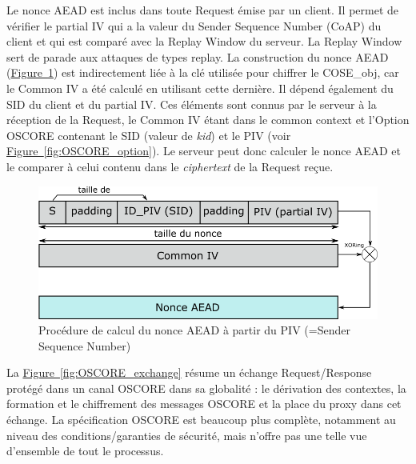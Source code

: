 \documentclass[]{report}
\newcommand{\wordlink}[2]{\hyperref[#2]{#1~\ref{#2}}}
\begin{document}
Le nonce AEAD est inclus dans toute Request émise par un client. Il permet de vérifier le partial IV qui a la valeur du Sender Sequence Number (CoAP) du client et qui est comparé avec la Replay Window du serveur. La Replay Window sert de parade aux attaques de types replay.
La construction du nonce AEAD (\wordlink{Figure}{fig:OSCORE_nonce}) est indirectement liée à la clé utilisée pour chiffrer le COSE\_obj, car le Common IV a été calculé en utilisant cette dernière. Il dépend également du SID du client et du partial IV. Ces éléments sont connus par le serveur à la réception de la Request, le Common IV étant dans le common context et l'Option OSCORE contenant le SID (valeur de \textit{kid}) et le PIV (voir \wordlink{Figure}{fig:OSCORE_option}). Le serveur peut donc calculer le nonce AEAD et le comparer à celui contenu dans le \textit{ciphertext} de la Request reçue. 
 
\vspace{0.2cm}

	\begin{figure}[!h]
	\centering
	\includegraphics[width=0.75\linewidth]{OSCORE_nonce}
	\caption{Procédure de calcul du nonce AEAD à partir du PIV (=Sender Sequence Number)}
	\label{fig:OSCORE_nonce}
	\end{figure}

\vspace{0.6cm}

La \wordlink{Figure}{fig:OSCORE_exchange} résume un échange Request/Response protégé dans un canal OSCORE dans sa globalité : le dérivation des contextes, la formation et le chiffrement des messages OSCORE et la place du proxy dans cet échange. La spécification OSCORE \cite{rfc8613} est beaucoup plus complète, notamment au niveau des conditions/garanties de sécurité, mais n'offre pas une telle vue d'ensemble de tout le processus. 

\newpage
\end{document}
